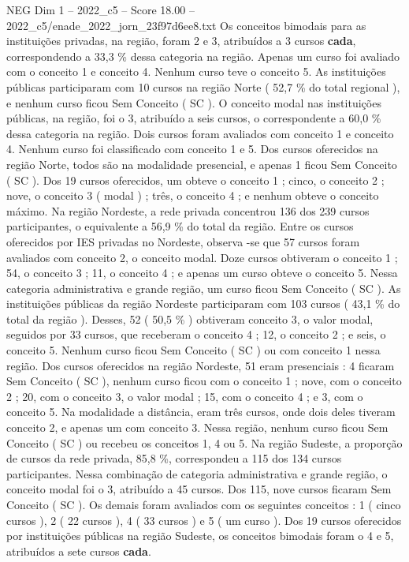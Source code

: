 \begin{textsample}{NEG Dim 1 – 2022\_c5 – Score 18.00 – 2022\_c5/enade\_2022\_jorn\_23f97d6ee8.txt}
Os conceitos bimodais para as instituições privadas, na região, foram 2 e 3, atribuídos a 3 cursos \textbf{cada}, correspondendo a 33,3 \% dessa categoria na região.
Apenas um curso foi avaliado com o conceito 1 e conceito 4.
Nenhum curso teve o conceito 5.
As instituições públicas participaram com 10 cursos na região Norte ( 52,7 \% do total regional ), e nenhum curso ficou Sem Conceito ( SC ).
O conceito modal nas instituições públicas, na região, foi o 3, atribuído a seis cursos, o correspondente a 60,0 \% dessa categoria na região.
Dois cursos foram avaliados com conceito 1 e conceito 4.
Nenhum curso foi classificado com conceito 1 e 5.
Dos cursos oferecidos na região Norte, todos são na modalidade presencial, e apenas 1 ficou Sem Conceito ( SC ).
Dos 19 cursos oferecidos, um obteve o conceito 1 ; cinco, o conceito 2 ; nove, o conceito 3 ( modal ) ; três, o conceito 4 ; e nenhum obteve o conceito máximo.
Na região Nordeste, a rede privada concentrou 136 dos 239 cursos participantes, o equivalente a 56,9 \% do total da região.
Entre os cursos oferecidos por IES privadas no Nordeste, observa -se que 57 cursos foram avaliados com conceito 2, o conceito modal.
Doze cursos obtiveram o conceito 1 ; 54, o conceito 3 ; 11, o conceito 4 ; e apenas um curso obteve o conceito 5.
Nessa categoria administrativa e grande região, um curso ficou Sem Conceito ( SC ).
As instituições públicas da região Nordeste participaram com 103 cursos ( 43,1 \% do total da região ).
Desses, 52 ( 50,5 \% ) obtiveram conceito 3, o valor modal, seguidos por 33 cursos, que receberam o conceito 4 ; 12, o conceito 2 ; e seis, o conceito 5.
Nenhum curso ficou Sem Conceito ( SC ) ou com conceito 1 nessa região.
Dos cursos oferecidos na região Nordeste, 51 eram presenciais : 4 ficaram Sem Conceito ( SC ), nenhum curso ficou com o conceito 1 ; nove, com o conceito 2 ; 20, com o conceito 3, o valor modal ; 15, com o conceito 4 ; e 3, com o conceito 5.
Na modalidade a distância, eram três cursos, onde dois deles tiveram conceito 2, e apenas um com conceito 3.
Nessa região, nenhum curso ficou Sem Conceito ( SC ) ou recebeu os conceitos 1, 4 ou 5.
Na região Sudeste, a proporção de cursos da rede privada, 85,8 \%, correspondeu a 115 dos 134 cursos participantes.
Nessa combinação de categoria administrativa e grande região, o conceito modal foi o 3, atribuído a 45 cursos.
Dos 115, nove cursos ficaram Sem Conceito ( SC ).
Os demais foram avaliados com os seguintes conceitos : 1 ( cinco cursos ), 2 ( 22 cursos ), 4 ( 33 cursos ) e 5 ( um curso ).
Dos 19 cursos oferecidos por instituições públicas na região Sudeste, os conceitos bimodais foram o 4 e 5, atribuídos a sete cursos \textbf{cada}.

\end{textsample}

